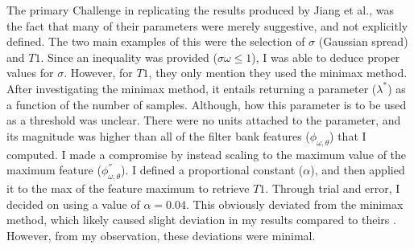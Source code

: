\documentclass[./rarnold_final_project.tex]{subfiles}
\begin{document}
\noindent The primary Challenge in replicating the results produced by Jiang et al., was the fact that many of their parameters were merely suggestive, and not explicitly defined.  The two main examples of this were the selection of $\sigma$ (Gaussian spread) and $T1$.  Since an inequality was provided ($\sigma\omega \leq 1$), I was able to deduce proper values for $\sigma$.  However, for $T1$, they only mention they used the minimax method.  After investigating the minimax method, it entails returning a parameter ($\lambda^{*}$)\cite{ref13} as a function of the number of samples.  Although, how this parameter is to be used as a threshold was unclear.  There were no units attached to the parameter, and its magnitude was higher than all of the filter bank features ($\phi_{\omega,\theta}$) that I computed.  I made a compromise by instead scaling to the maximum value of the maximum feature ($\phi^{''}_{\omega,\theta}$).  I defined a proportional constant ($\alpha$), and then applied it to the max of the feature maximum to retrieve $T1$.  Through trial and error, I decided on using a value of $\alpha = 0.04$.  This obviously deviated from the minimax method, which likely caused slight deviation in my results compared to theirs \cite{main}.  However, from my observation, these deviations were minimal.
\\ \\
\end{document}
